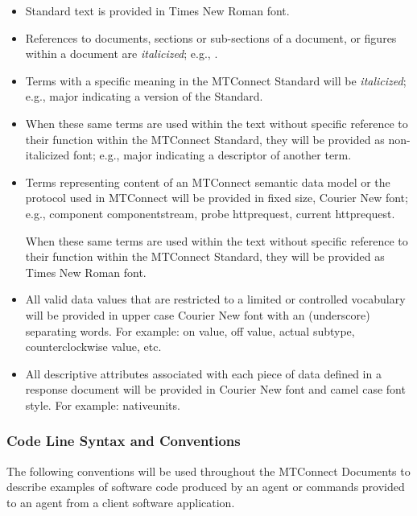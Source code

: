 \begin{itemize}
\item	Standard text is provided in Times New Roman font.

\item	References to documents, sections or sub-sections of a document, or figures within a document are \textit{italicized}; e.g., .

\item 	Terms with a specific meaning in the MTConnect Standard will be \textit{italicized}; e.g., \gls{major} indicating a version of the Standard.

\item 	When these same terms are used within the text without specific reference to their function within the MTConnect Standard, they will be provided as non-italicized font; e.g., major indicating a descriptor of another term.

\item 	Terms representing content of an MTConnect \gls{semantic data model} or the protocol used in MTConnect will be provided in fixed size, Courier New font; e.g., \gls{component componentstream}, \gls{probe httprequest}, \gls{current httprequest}.   

\tab When these same terms are used within the text without specific reference to their function within the MTConnect Standard, they will be provided as Times New Roman font.

\item	All \glspl{valid data value} that are restricted to a limited or controlled vocabulary will be provided in upper case Courier New font with an \textunderscore  (underscore) separating words.  For example: \gls{on value}, \gls{off value}, \gls{actual subtype}, \gls{counterclockwise value}, etc.

\item 	All descriptive attributes associated with each piece of data defined in a \gls{response document} will be provided in Courier New font and camel case font style.  For example: \gls{nativeunits}.
\end{itemize}

\subsubsection{Code Line Syntax and Conventions}

The following conventions will be used throughout the MTConnect Documents to describe examples of software code produced by an \gls{agent} or commands provided to an \gls{agent} from a client software application.

